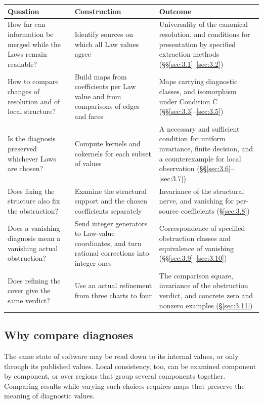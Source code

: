 \begin{xltabular}{\linewidth}{@{}LLL@{}}
\toprule
Question & Construction & Outcome \\
\midrule
\endhead
How far can information be merged while the Laws remain readable? & Identify sources on which all Law values agree & Universality of the canonical resolution, and conditions for presentation by specified extraction methods (\S\S\ref{sec:3.1}--\ref{sec:3.2}) \\
\addlinespace[3pt]
How to compare changes of resolution and of local structure? & Build maps from coefficients per Law value and from comparisons of edges and faces & Maps carrying diagnostic classes, and isomorphism under Condition C (\S\S\ref{sec:3.3}--\ref{sec:3.5}) \\
\addlinespace[3pt]
Is the diagnosis preserved whichever Laws are chosen? & Compute kernels and cokernels for each subset of values & A necessary and sufficient condition for uniform invariance, finite decision, and a counterexample for local observation (\S\S\ref{sec:3.6}--\ref{sec:3.7}) \\
\addlinespace[3pt]
Does fixing the structure also fix the obstruction? & Examine the structural support and the chosen coefficients separately & Invariance of the structural nerve, and vanishing for per-source coefficients (\S\ref{sec:3.8}) \\
\addlinespace[3pt]
Does a vanishing diagnosis mean a vanishing actual obstruction? & Send integer generators to Law-value coordinates, and turn rational corrections into integer ones & Correspondence of specified obstruction classes and equivalence of vanishing (\S\S\ref{sec:3.9}--\ref{sec:3.10}) \\
\addlinespace[3pt]
Does refining the cover give the same verdict? & Use an actual refinement from three charts to four & The comparison square, invariance of the obstruction verdict, and concrete zero and nonzero examples (\S\ref{sec:3.11}) \\
\bottomrule
\end{xltabular}

\subsection*{Why compare diagnoses}

The same state of software may be read down to its internal values, or only through its
published values. Local consistency, too, can be examined component by component, or
over regions that group several components together. Comparing results while varying
such choices requires maps that preserve the meaning of diagnostic values.

